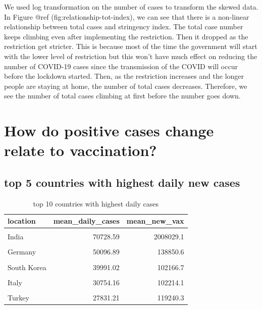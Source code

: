 \documentclass[11pt,a4paper,]{article}
\begin{document}
We used log transformation on the number of cases to transform the skewed data. In Figure @ref (fig:relationship-tot-index), we can see that there is a non-linear relationship between total cases and stringency index. The total case number keeps climbing even after implementing the restriction. Then it dropped as the restriction get stricter. This is because most of the time the government will start with the lower level of restriction but this won't have much effect on reducing the number of COVID-19 cases since the transmission of the COVID will occur before the lockdown started. Then, as the restriction increases and the longer people are staying at home, the number of total cases decreases. Therefore, we see the number of total cases climbing at first before the number goes down.

\clearpage

\section*{ How do positive cases change relate to vaccination?}

\subsection*{top 5 countries with highest daily new cases}

\begin{table}[!h]

\caption{\label{tab:table3}top 10 countries with highest daily cases}
\centering
\begin{tabular}[t]{lrr}
\toprule
location & mean\_daily\_cases & mean\_new\_vax\\
\midrule
\cellcolor{gray!6}{United States} & \cellcolor{gray!6}{120484.50} & \cellcolor{gray!6}{460807.1}\\
India & 70728.59 & 2008029.1\\
\cellcolor{gray!6}{France} & \cellcolor{gray!6}{56648.85} & \cellcolor{gray!6}{114807.6}\\
Germany & 50096.89 & 138850.6\\
\cellcolor{gray!6}{Brazil} & \cellcolor{gray!6}{46861.09} & \cellcolor{gray!6}{372419.6}\\
\addlinespace
South Korea & 39991.02 & 102166.7\\
\cellcolor{gray!6}{United Kingdom} & \cellcolor{gray!6}{38446.46} & \cellcolor{gray!6}{110154.3}\\
Italy & 30754.16 & 102214.1\\
\cellcolor{gray!6}{Russia} & \cellcolor{gray!6}{29094.76} & \cellcolor{gray!6}{203228.0}\\
Turkey & 27831.21 & 119240.3\\
\bottomrule
\end{tabular}
\end{table}
\end{document}
